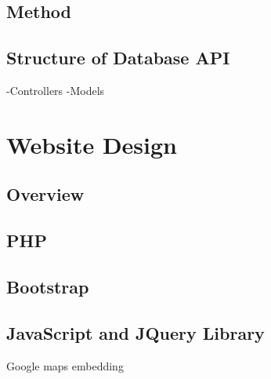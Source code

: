 	\subsection{Method}
	\subsection{Structure of Database API}
		-Controllers
		-Models
\section{Website Design}
	\subsection{Overview}
	\subsection{PHP}
	\subsection{Bootstrap}
	\subsection{JavaScript and JQuery Library}
	Google maps embedding






